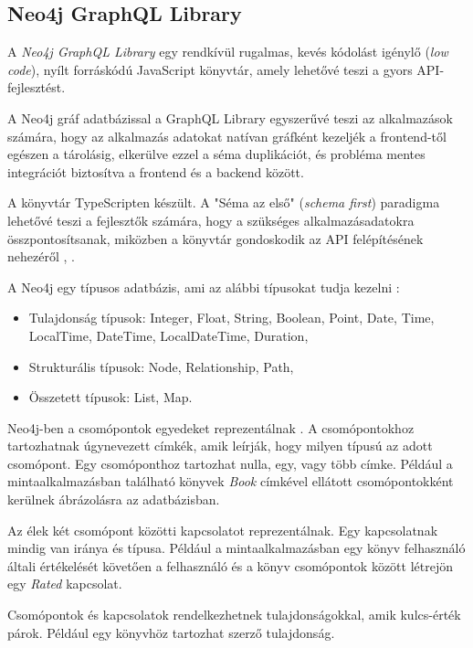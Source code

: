 \subsection{Neo4j GraphQL Library}

A \textit{Neo4j GraphQL Library} egy rendkívül rugalmas, kevés kódolást igénylő (\textit{low code}), nyílt forráskódú JavaScript könyvtár, amely lehetővé teszi a gyors API-fejlesztést.

A Neo4j gráf adatbázissal a GraphQL Library egyszerűvé teszi az alkalmazások számára, hogy az alkalmazás adatokat natívan gráfként kezeljék a frontend-től egészen a tárolásig, elkerülve ezzel a séma duplikációt, és probléma mentes integrációt biztosítva a frontend és a backend között.

A könyvtár TypeScripten készült. A "Séma az első" (\textit{schema first}) paradigma lehetővé teszi a fejlesztők számára, hogy a szükséges alkalmazásadatokra összpontosítsanak, miközben a könyvtár gondoskodik az API felépítésének nehezéről  \cite{neo4j-graphql-library1}, \cite{neo4j-graphql-library2}.


A Neo4j egy típusos adatbázis, ami az alábbi típusokat tudja kezelni \cite{neo4j-values}:
\begin{itemize}
    \item Tulajdonság típusok: Integer, Float, String, Boolean, Point, Date, Time, LocalTime, DateTime, LocalDateTime, Duration,
    \item Strukturális típusok: Node, Relationship, Path,
    \item Összetett típusok: List, Map.
\end{itemize}

Neo4j-ben a csomópontok egyedeket reprezentálnak \cite{adatok-leirasa}. A csomópontokhoz tartozhatnak úgynevezett címkék, amik leírják, hogy milyen típusú az adott csomópont. Egy csomóponthoz tartozhat nulla, egy, vagy több címke. Például a mintaalkalmazásban található könyvek \textit{Book} címkével ellátott csomópontokként kerülnek ábrázolásra az adatbázisban.

Az élek két csomópont közötti kapcsolatot reprezentálnak. Egy kapcsolatnak mindig van iránya és típusa. Például a mintaalkalmazásban egy könyv felhasználó általi értékelését követően a felhasználó és a könyv csomópontok között létrejön egy \textit{Rated} kapcsolat.

Csomópontok és kapcsolatok rendelkezhetnek tulajdonságokkal, amik kulcs-érték párok. Például egy könyvhöz tartozhat szerző tulajdonság.

